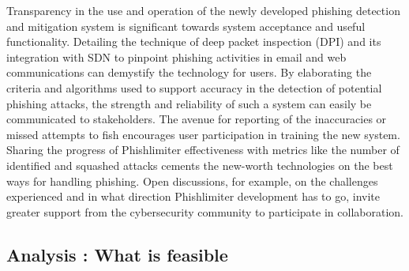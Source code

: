 \begin{itemize}
Transparency in the use and operation of the newly developed phishing detection and mitigation system is significant towards system acceptance and useful functionality. Detailing the technique of deep packet inspection (DPI) and its integration with SDN to pinpoint phishing activities in email and web communications can demystify the technology for users. By elaborating the criteria and algorithms used to support accuracy in the detection of potential phishing attacks, the strength and reliability of such a system can easily be communicated to stakeholders. The avenue for reporting of the inaccuracies or missed attempts to fish encourages user participation in training the new system. Sharing the progress of Phishlimiter effectiveness with metrics like the number of identified and squashed attacks cements the new-worth technologies on the best ways for handling phishing. Open discussions, for example, on the challenges experienced and in what direction Phishlimiter development has to go, invite greater support from the cybersecurity community to participate in collaboration.

\end{itemize}

\subsection{Analysis : What is feasible }

